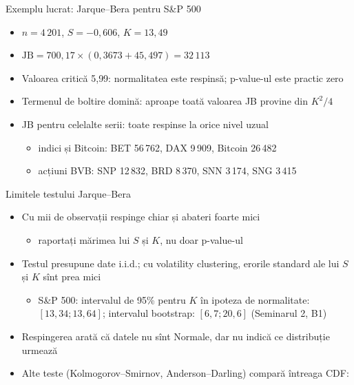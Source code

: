 \begin{frame}{Exemplu lucrat: Jarque--Bera pentru S\&P 500}
\itemsize{\small}
\begin{itemize}
    \item $n = 4\,201$, $S = -0{,}606$, $K = 13{,}49$
    \item $\text{JB} = 700{,}17 \times (0{,}3673 + 45{,}497) = 32\,113$
    \item Valoarea critică 5{,}99: normalitatea este respinsă; p-value-ul este practic zero
    \item Termenul de boltire domină: aproape toată valoarea JB provine din $K^2/4$
    \item JB pentru celelalte serii: toate respinse la orice nivel uzual
    \begin{itemize}
        \item indici și Bitcoin: BET 56\,762, DAX 9\,909, Bitcoin 26\,482
        \item acțiuni BVB: SNP 12\,832, BRD 8\,370, SNN 3\,174, SNG 3\,415
    \end{itemize}
\end{itemize}
\end{frame}

\begin{frame}{Limitele testului Jarque--Bera}
\itemsize{\small}
\begin{itemize}
    \item Cu mii de observații respinge chiar și abateri foarte mici
    \begin{itemize}
        \item raportați mărimea lui $S$ și $K$, nu doar p-value-ul
    \end{itemize}
    \item Testul presupune date i.i.d.; cu volatility clustering, erorile standard ale lui $S$ și $K$ sînt prea mici
    \begin{itemize}
        \item S\&P 500: intervalul de 95\% pentru $K$ în ipoteza de normalitate: $[13{,}34; 13{,}64]$; intervalul bootstrap: $[6{,}7; 20{,}6]$ (Seminarul 2, B1)
    \end{itemize}
    \item Respingerea arată că datele nu sînt Normale, dar nu indică ce distribuție urmează
    \item Alte teste (Kolmogorov--Smirnov, Anderson--Darling) compară întreaga CDF: 
\end{itemize}
\end{frame}

